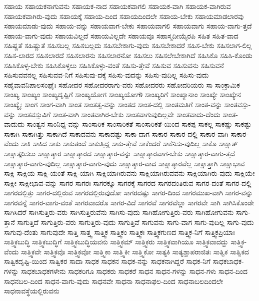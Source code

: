 {ಸಹಾಯ
ಸಹಾಯಕನಾಗುವನು
ಸಹಾಯಕ-ನಾದ
ಸಹಾಯಕವಾಗಲಿ
ಸಹಾಯಕ-ವಾಗಿ
ಸಹಾಯಕ-ವಾಗಿರುವ
ಸಹಾಯಕವಾಗಿರು-ವುದು
ಸಹಾಯಕ್ಕೆ
ಸಹಾಯ-ದಿಂದ
ಸಹಾಯದಿಂದಲೇ
ಸಹಾಯ-ಬೇಕು
ಸಹಾಯಮಾಡಲಾರವು
ಸಹಾಯಮಾಡು-ವುದು
ಸಹಾಯ-ವನ್ನು
ಸಹಾಯವಾಗ-ಬೇಕು
ಸಹಾಯವಾಗಲಿ
ಸಹಾಯವಾಗು
ಸಹಾಯ-ವಾಗು-ತ್ತದೆ
ಸಹಾಯ-ವಾಗು-ವುದು
ಸಹಾಯವಿಲ್ಲದೆ
ಸಹಾಯವಿಲ್ಲದೇ
ಸಹಾಯವೂ
ಸಹಾಸ್ಮದೀಯೈರಪಿ
ಸಹಿತ
ಸಹಿತ-ವಾದ
ಸಹಿಷ್ಣತೆ
ಸಹಿಷ್ಣುತೆ
ಸಹಿಸಬಲ್ಲ
ಸಹಿಸಬಲ್ಲದು
ಸಹಿಸಬೇಕಾಗು-ವುದು
ಸಹಿಸಬೇಕಾದರೆ
ಸಹಿಸ-ಬೇಕು
ಸಹಿಸಲಾಗ-ಲಿಲ್ಲ
ಸಹಿಸ-ಲಾರದ
ಸಹಿಸಲಾರದೆ
ಸಹಿಸಲಾರನು
ಸಹಿಸಲಾರನೋ
ಸಹಿಸಲು
ಸಹಿಸಲೇಬೇಕಾಗಿದೆ
ಸಹಿಸಿಕೊ
ಸಹಿಸಿ-ಕೊಂಡು
ಸಹಿಸಿಕೊಳ್ಳ-ಬೇಕು
ಸಹಿಸಿಕೊಳ್ಳಲು
ಸಹಿಸಿಕೊಳ್ಳು-ವಂತೆ
ಸಹಿಸು-ತ್ತೇವೆ
ಸಹಿಸುವ
ಸಹಿಸುವನು
ಸಹಿಸುವನೆ
ಸಹಿಸುವವನಲ್ಲ
ಸಹಿಸುವವ-ನಿಗೆ
ಸಹಿಸುವು-ದಕ್ಕೆ
ಸಹಿಸು-ವುದನ್ನು
ಸಹಿಸು-ವುದಿಲ್ಲ
ಸಹಿಸು-ವುದು
ಸಹೈವಾವನಿಪಾಲಸಂಘೈಃ
ಸಹೋದರ
ಸಹೋದರರಾಗು-ವರು
ಸಹೋದರರು
ಸಹೋದರಿಯರು
ಸಾ
ಸಾಂಕ್ರಾಮಿಕ
ಸಾಂಖ್ಯ
ಸಾಂಖ್ಯಂ
ಸಾಂಖ್ಯದೃಷ್ಟಿಗೆ
ಸಾಂಖ್ಯಯೋಗ
ಸಾಂಖ್ಯಯೋಗೌ
ಸಾಂಖ್ಯರಿಗೆ
ಸಾಂಖ್ಯಾನಾಂ
ಸಾಂಖ್ಯೇ
ಸಾಂಖ್ಯೇನ
ಸಾಂಖ್ಯೈಃ
ಸಾಂಗ
ಸಾಂಗ-ವಾಗಿ
ಸಾಂತ
ಸಾಂತತ್ವ-ವನ್ನು
ಸಾಂತದ
ಸಾಂತ-ದಲ್ಲಿ
ಸಾಂತಮತಿಗೆ
ಸಾಂತ-ವನ್ನು
ಸಾಂತವಸ್ತು-ವನ್ನು
ಸಾಂತವಸ್ತುವಿಗೆ
ಸಾಂತ-ವಾಗಿ
ಸಾಂತವಾಗಿರ-ಬೇಕು
ಸಾಂತವಾಗುವುದಿಲ್ಲವೇ
ಸಾಂತವಾದು-ದೆಂದು
ಸಾಂತ-ವಾದುದು
ಸಾಂತ್ವನ
ಸಾಂನಿಧ್ಯ-ವನ್ನು
ಸಾಂಸಾರಿಕ
ಸಾಂಸಾರಿಕತೆ
ಸಾಂಸಾರಿಕತೆ-ಯಿಂದ
ಸಾಕಪ್ಪ
ಸಾಕಲ್ಲ
ಸಾಕಷ್ಚು
ಸಾಕಷ್ಟು
ಸಾಕಾಗಿ
ಸಾಕಾಗಿತ್ತು
ಸಾಕಾಗಿದೆ
ಸಾಕಾದವನು
ಸಾಕಾದಷ್ಟು
ಸಾಕಾ-ದಾಗ
ಸಾಕಾರ
ಸಾಕಾರ-ದಲ್ಲಿ
ಸಾಕಾರ-ವಾಗಿ
ಸಾಕಾರ-ವೆಂದು
ಸಾಕಿ
ಸಾಕಿದ
ಸಾಕು
ಸಾಕುತಂದೆ
ಸಾಕುತ್ತಿದ್ದ
ಸಾಕು-ತ್ತೇವೆ
ಸಾಕೆಂದರೆ
ಸಾಕೆನಿಸು-ವುದಿಲ್ಲ
ಸಾಕೊ
ಸಾಕ್ಷಾತ್
ಸಾಕ್ಷಾತ್ಕರಿಸಲು
ಸಾಕ್ಷಾತ್ಕಾರ
ಸಾಕ್ಷಾತ್ಕಾರದ
ಸಾಕ್ಷಾತ್ಕಾರ-ವನ್ನು
ಸಾಕ್ಷಾತ್ಕಾರವಾಗ-ಬೇಕು
ಸಾಕ್ಷಾತ್ಕಾರ-ವಾಗು-ತ್ತದೆ
ಸಾಕ್ಷಾತ್ಕಾರ-ವಾಗು-ವುದಿಲ್ಲ
ಸಾಕ್ಷಾತ್ಕಾರ-ವಾಗು-ವುದು
ಸಾಕ್ಷಾತ್ಕಾರ-ವಾದ
ಸಾಕ್ಷಾತ್ಕಾರವೆಲ್ಲ
ಸಾಕ್ಷಾತ್ತಾಗಿ
ಸಾಕ್ಷಾಭಾವ
ಸಾಕ್ಷಿ
ಸಾಕ್ಷಿಯ
ಸಾಕ್ಷಿ-ಯಂತೆ
ಸಾಕ್ಷಿ-ಯಾಗಿ
ಸಾಕ್ಷಿಯಾಗಿರುವನು
ಸಾಕ್ಷಿಯಾಗಿರುವವನು
ಸಾಕ್ಷಿಯಾಗಿರು-ವುದು
ಸಾಕ್ಷಿಯೇ
ಸಾಕ್ಷೀ
ಸಾಕ್ಷೀಭಾವ-ವನ್ನು
ಸಾಗರ
ಸಾಗರಃ
ಸಾಗರಕ್ಕೂ
ಸಾಗರಕ್ಕೆ
ಸಾಗರದ
ಸಾಗರದಂತಿರುವ
ಸಾಗರ-ದಂತೆ
ಸಾಗರ-ದಲ್ಲಿ
ಸಾಗರದಲ್ಲಿತ್ತು
ಸಾಗರ-ದಲ್ಲಿರುವ
ಸಾಗರದಲ್ಲಿರುವುದೋ
ಸಾಗರದಷ್ಟು
ಸಾಗರ-ದಿಂದ
ಸಾಗರಮುಖ-ವಾಗಿ
ಸಾಗರ-ವನ್ನು
ಸಾಗರವನ್ನೆ
ಸಾಗರ-ವಾಗು-ವಂತೆ
ಸಾಗರವಾದರೊ
ಸಾಗರ-ವಿದೆ
ಸಾಗರವೆ
ಸಾಗರವೆಲ್ಲಾ
ಸಾಗರವೇ
ಸಾಗಿ
ಸಾಗಿಸಿಕೊಂಡೇ
ಸಾಗಿಸಿದರೆ
ಸಾಗಿಸುತ್ತಿರು-ವರು
ಸಾಗಿಸುತ್ತಿರುವೆನು
ಸಾಗಿಸು-ವುದು
ಸಾಗಿಹೋಗುತ್ತಿರು-ವರು
ಸಾಗಿಹೋಗುವನು
ಸಾಗು-ತ್ತಾನೆ
ಸಾಗುತ್ತಿದೆ
ಸಾಗುತ್ತಿರು-ವರು
ಸಾಗುತ್ತಿರು-ವುದು
ಸಾಗುತ್ತಿವೆ
ಸಾಗುವನು
ಸಾಗು-ವಾಗ
ಸಾಗು-ವುದಿಲ್ಲ
ಸಾಗು-ವುದು
ಸಾಗುವು-ದೆಂತು
ಸಾಗುವುದೇ
ಸಾತ್ತಿ
ಸಾತ್ತ್ವ
ಸಾತ್ತ್ವಿಕ
ಸಾತ್ತ್ವಿಕಂ
ಸಾತ್ತ್ವಿಕಃ
ಸಾತ್ತ್ವಿಕಗುಣದ
ಸಾತ್ತ್ವಿಕ-ನಿಗೆ
ಸಾತ್ತ್ವಿಕಪ್ರಿಯಾಃ
ಸಾತ್ತ್ವಿಕಬುದ್ಧಿ
ಸಾತ್ತ್ವಿಕಬುದ್ಧಿಗೆ
ಸಾತ್ತ್ವಿಕಬುದ್ಧಿಯವನು
ಸಾತ್ತ್ವಿಕಮ್
ಸಾತ್ತ್ವಿಕರು
ಸಾತ್ತ್ವಿಕವಾಗಿಯೂ
ಸಾತ್ತ್ವಿಕವಾದದ್ದು
ಸಾತ್ತ್ವಿಕ-ವೆಂದು
ಸಾತ್ತ್ವಿಕವೇ
ಸಾತ್ತ್ವಿಕವೊ
ಸಾತ್ತ್ವಿಕವೋ
ಸಾತ್ತ್ವಿಕಾ
ಸಾತ್ತ್ವಿಕೀ
ಸಾತ್ತ್ವಿಕೋ
ಸಾತ್ಯಕಿ
ಸಾತ್ಯಶ್ಚಾಪರಾಜಿತಃ
ಸಾತ್ವಿಕ
ಸಾತ್ವಿಕದ
ಸಾತ್ವಿಕದೃಷ್ಟಿ-ಯಿಂದ
ಸಾತ್ವಿಕರ
ಸಾದಾ
ಸಾಧಕ
ಸಾಧಕನ
ಸಾಧಕ-ನನ್ನು
ಸಾಧಕನಾಗಿದ್ದರೆ
ಸಾಧಕ-ನಿಗೆ
ಸಾಧಕಬಾಧಕ-ಗಳನ್ನು
ಸಾಧಕಬಾಧಕಗಳೇನು
ಸಾಧಕರಿಗೂ
ಸಾಧಕರು
ಸಾಧಕರೆ
ಸಾಧನ
ಸಾಧನ-ಗಳನ್ನು
ಸಾಧನ-ಗಳು
ಸಾಧನ-ದಿಂದ
ಸಾಧನಬಲ-ದಿಂದ
ಸಾಧನ-ವಾಗು-ವುದು
ಸಾಧನವೇ
ಸಾಧನಾ
ಸಾಧನಾಫಲ-ದಿಂದ
ಸಾಧನಾಬಲದಿಂದಲೇ
ಸಾಧನಾವಸ್ಥೆಯಲ್ಲಿರುವನು
}
